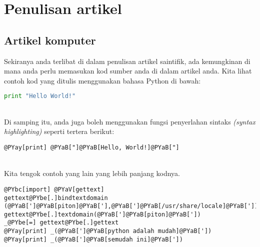 \chapter{Penulisan artikel}

\section{Artikel komputer}
Sekiranya anda terlibat di dalam penulisan artikel saintifik, ada kemungkinan di mana anda perlu memasukan kod sumber anda di dalam artikel anda. 
Kita lihat contoh kod yang ditulis menggunakan bahasa Python di bawah:
\bigskip

\begin{minipage}{\textwidth}
\begin{lstlisting}[frame=shadowbox,language=python]
print "Hello World!"
\end{lstlisting}
\label{hello-simple}
\end{minipage} \\

Di samping itu, anda juga boleh menggunakan fungsi penyerlahan sintaks \textit{(syntax highlighting)} seperti tertera berikut:\\

\begin{minipage}{\textwidth}
\begin{Verbatim}[frame=single,commandchars=@\[\]]
@PYay[print] @PYaB["]@PYaB[Hello, World!]@PYaB["] 
\end{Verbatim}
\label{hello-colour}
\end{minipage} \\

Kita tengok contoh yang lain yang lebih panjang kodnya.

\begin{minipage}{\textwidth}
\begin{Verbatim}[frame=single,commandchars=@\[\]]
@PYbc[import] @PYaV[gettext]
gettext@PYbe[.]bindtextdomain (@PYaB[']@PYaB[piton]@PYaB['],@PYaB[']@PYaB[/usr/share/locale]@PYaB['])
gettext@PYbe[.]textdomain(@PYaB[']@PYaB[piton]@PYaB['])
_@PYbe[=] gettext@PYbe[.]gettext
@PYay[print] _(@PYaB[']@PYaB[python adalah mudah]@PYaB['])
@PYay[print] _(@PYaB[']@PYaB[semudah ini]@PYaB['])
\end{Verbatim}
\label{piton}
\end{minipage} \\

